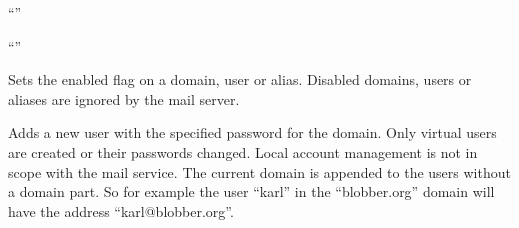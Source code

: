 \begin{compactitem}
\item ``''
\item ``''
\end{compactitem}


Sets the enabled flag on a domain, user or alias. Disabled domains, users or
aliases are ignored by the mail server.


Adds a new user with the specified password for the domain.
Only virtual users are created or their passwords changed.
Local account management is not in scope with the mail service.
The current domain is appended to the users without a domain part. 
So for example the user ``karl'' in the ``blobber.org'' domain will 
have the address ``karl@blobber.org''.

